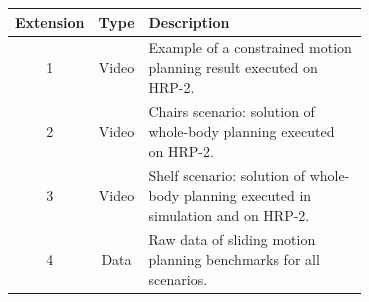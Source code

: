 \documentclass{article}
\begin{document}
\begin{table}[H]
\begin{tabular}{c c m{0.7\linewidth}}
\hline
Extension & Type & Description \\
\hline
1 & Video & Example of a constrained motion planning result executed
on HRP-2. \\
2 & Video & Chairs scenario: solution of whole-body planning executed
on HRP-2. \\
3 & Video & Shelf scenario: solution of whole-body planning executed
in simulation and on HRP-2. \\
4 & Data & Raw data of sliding motion planning benchmarks for all
scenarios. \\
\hline
\end{tabular}
\end{table}

   



\end{document}

